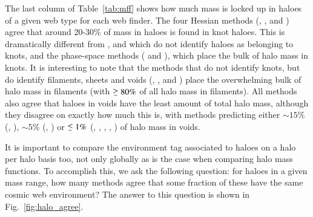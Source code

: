 %
%

The last column of Table~\ref{tab:mff} shows how much mass is locked up in haloes of a given web type for each web finder. The four Hessian methods (\nexus{}, \tweb{}, \vweb{} and \classic{}) agree that around 20-30\% of mass in haloes is found in knot haloes. This is dramatically different from \disperse{}, \mmft{} and \spine{} which do not identify haloes as belonging to knots, and the phase-space methods (\origami{} and \mswa{}), which place the bulk of halo mass in knots. It is interesting to note that the methods that do not identify knots, but do identify filaments, sheets and voids (\spine{}, \mmft{}, and \disperse{}) place the overwhelming bulk of halo mass in filaments (with $\gsim 80\%$ of all halo mass in filaments). All methods also agree that haloes in voids have the least amount of total halo mass, although they disagree on exactly how much this is, with methods predicting either $\sim 15\%$  (\vweb{}, \classic{}), $\sim 5\%$ (\tweb{}, \disperse{}) or $\lsim 1\%$ (\nexus{}, \origami{}, \mswa{}, \spine, \mmft) of halo mass in voids.


It is important to compare the environment tag associated to haloes on a halo per halo basis too, not only globally as is the case when comparing halo mass functions. To accomplish this, we ask the following question: for haloes in a given mass range, how many methods agree that some fraction of these have the same cosmic web environment? The answer to this question is shown in Fig.~\ref{fig:halo_agree}.


